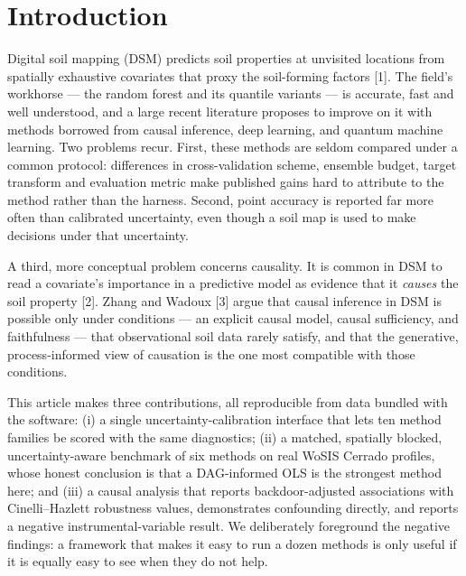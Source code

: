 \documentclass[10pt,letterpaper]{article}
\begin{document}

\linenumbers

\section{Introduction}\label{introduction}

Digital soil mapping (DSM) predicts soil properties at unvisited
locations from spatially exhaustive covariates that proxy the
soil-forming factors {[}1{]}. The field's workhorse --- the random
forest and its quantile variants --- is accurate, fast and well
understood, and a large recent literature proposes to improve on it with
methods borrowed from causal inference, deep learning, and quantum
machine learning. Two problems recur. First, these methods are seldom
compared under a common protocol: differences in cross-validation
scheme, ensemble budget, target transform and evaluation metric make
published gains hard to attribute to the method rather than the harness.
Second, point accuracy is reported far more often than calibrated
uncertainty, even though a soil map is used to make decisions under that
uncertainty.

A third, more conceptual problem concerns causality. It is common in DSM
to read a covariate's importance in a predictive model as evidence that
it \emph{causes} the soil property {[}2{]}. Zhang and Wadoux {[}3{]}
argue that causal inference in DSM is possible only under conditions ---
an explicit causal model, causal sufficiency, and faithfulness --- that
observational soil data rarely satisfy, and that the generative,
process-informed view of causation is the one most compatible with those
conditions.

This article makes three contributions, all reproducible from data
bundled with the software: (i) a single uncertainty-calibration
interface that lets ten method families be scored with the same
diagnostics; (ii) a matched, spatially blocked, uncertainty-aware
benchmark of six methods on real WoSIS Cerrado profiles, whose honest
conclusion is that a DAG-informed OLS is the strongest method here; and
(iii) a causal analysis that reports backdoor-adjusted associations with
Cinelli--Hazlett robustness values, demonstrates confounding directly,
and reports a negative instrumental-variable result. We deliberately
foreground the negative findings: a framework that makes it easy to run
a dozen methods is only useful if it is equally easy to see when they do
not help.
\end{document}

